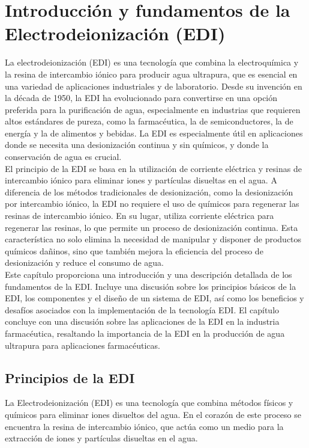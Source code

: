 \chapter{Introducción y fundamentos de la Electrodeionización (EDI)}\label{cap:fundamentosEDI}
La electrodeionización (EDI) es una tecnología que combina la electroquímica y la resina de intercambio iónico para producir agua ultrapura, que es esencial en una variedad de aplicaciones industriales y de laboratorio. Desde su invención en la década de 1950, la EDI ha evolucionado para convertirse en una opción preferida para la purificación de agua, especialmente en industrias que requieren altos estándares de pureza, como la farmacéutica, la de semiconductores, la de energía y la de alimentos y bebidas. La EDI es especialmente útil en aplicaciones donde se necesita una desionización continua y sin químicos, y donde la conservación de agua es crucial. \\

El principio de la EDI se basa en la utilización de corriente eléctrica y resinas de intercambio iónico para eliminar iones y partículas disueltas en el agua. A diferencia de los métodos tradicionales de desionización, como la desionización por intercambio iónico, la EDI no requiere el uso de químicos para regenerar las resinas de intercambio iónico. En su lugar, utiliza corriente eléctrica para regenerar las resinas, lo que permite un proceso de desionización continua. Esta característica no solo elimina la necesidad de manipular y disponer de productos químicos dañinos, sino que también mejora la eficiencia del proceso de desionización y reduce el consumo de agua. \\

Este capítulo proporciona una introducción y una descripción detallada de los fundamentos de la EDI. Incluye una discusión sobre los principios básicos de la EDI, los componentes y el diseño de un sistema de EDI, así como los beneficios y desafíos asociados con la implementación de la tecnología EDI. El capítulo concluye con una discusión sobre las aplicaciones de la EDI en la industria farmacéutica, resaltando la importancia de la EDI en la producción de agua ultrapura para aplicaciones farmacéuticas. \\

\section{Principios de la EDI}
La Electrodeionización (EDI) es una tecnología que combina métodos físicos y químicos para eliminar iones disueltos del agua. En el corazón de este proceso se encuentra la resina de intercambio iónico, que actúa como un medio para la extracción de iones y partículas disueltas en el agua. \\


